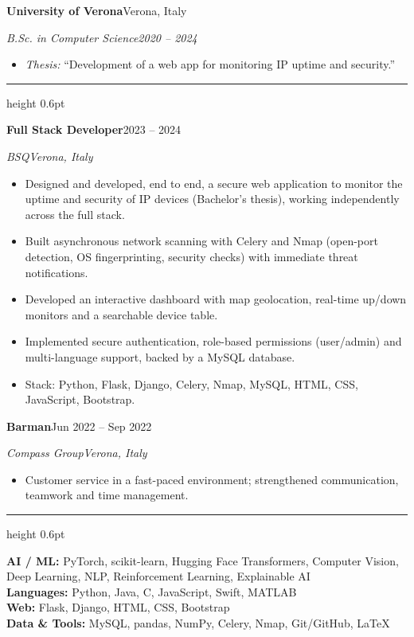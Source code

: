 \documentclass[a4paper,11pt]{article}
\newcommand{\cvsec}[1]{\vspace{7pt}{\large\scshape #1}\par\vspace{1.5pt}\hrule height 0.6pt\vspace{5pt}}
\newcommand{\cventry}[4]{\textbf{#1}\hfill #2\par\textit{#3}\hfill\textit{#4}\par\vspace{1pt}}
\begin{document}
\cventry{University of Verona}{Verona, Italy}{B.Sc. in Computer Science}{2020 -- 2024}
\begin{itemize}
  \item \textit{Thesis:} ``Development of a web app for monitoring IP uptime and security.''
\end{itemize}

\cvsec{Experience}

\cventry{Full Stack Developer}{2023 -- 2024}{BSQ}{Verona, Italy}
\begin{itemize}
  \item Designed and developed, end to end, a secure web application to monitor the uptime and security of IP devices (Bachelor's thesis), working independently across the full stack.
  \item Built asynchronous network scanning with Celery and Nmap (open-port detection, OS fingerprinting, security checks) with immediate threat notifications.
  \item Developed an interactive dashboard with map geolocation, real-time up/down monitors and a searchable device table.
  \item Implemented secure authentication, role-based permissions (user/admin) and multi-language support, backed by a MySQL database.
  \item Stack: Python, Flask, Django, Celery, Nmap, MySQL, HTML, CSS, JavaScript, Bootstrap.
\end{itemize}

\cventry{Barman}{Jun 2022 -- Sep 2022}{Compass Group}{Verona, Italy}
\begin{itemize}
  \item Customer service in a fast-paced environment; strengthened communication, teamwork and time management.
\end{itemize}

\cvsec{Technical Skills}

\textbf{AI / ML:} PyTorch, scikit-learn, Hugging Face Transformers, Computer Vision, Deep Learning, NLP, Reinforcement Learning, Explainable AI \\[3pt]
\textbf{Languages:} Python, Java, C, JavaScript, Swift, MATLAB \\[3pt]
\textbf{Web:} Flask, Django, HTML, CSS, Bootstrap \\[3pt]
\textbf{Data \& Tools:} MySQL, pandas, NumPy, Celery, Nmap, Git/GitHub, LaTeX
\end{document}
